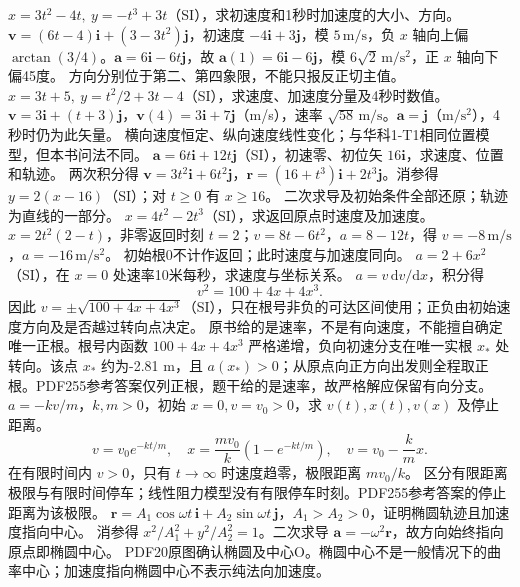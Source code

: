 \problemtext $x=3t^2-4t,\ y=-t^3+3t$（SI），求初速度和1秒时加速度的大小、方向。
\workings $\bm v=(6t-4)\bm i+(3-3t^2)\bm j$，初速度 $-4\bm i+3\bm j$，模 $5\,\mathrm{m/s}$，负 $x$ 轴向上偏 $\arctan(3/4)$。$\bm a=6\bm i-6t\bm j$，故 $\bm a(1)=6\bm i-6\bm j$，模 $6\sqrt2\,\mathrm{m/s^2}$，正 $x$ 轴向下偏45度。
\crosscheck 方向分别位于第二、第四象限，不能只报反正切主值。
\problemtext $x=3t+5,\ y=t^2/2+3t-4$（SI），求速度、加速度分量及4秒时数值。
\workings $\bm v=3\bm i+(t+3)\bm j$，$\bm v(4)=3\bm i+7\bm j$（m/s），速率 $\sqrt{58}\,\mathrm{m/s}$。$\bm a=\bm j$（$\mathrm{m/s^2}$），4秒时仍为此矢量。
\crosscheck 横向速度恒定、纵向速度线性变化；与华科1-T1相同位置模型，但本书问法不同。
\problemtext $\bm a=6t\bm i+12t\bm j$（SI），初速零、初位矢 $16\bm i$，求速度、位置和轨迹。
\workings 两次积分得 $\bm v=3t^2\bm i+6t^2\bm j$，$\bm r=(16+t^3)\bm i+2t^3\bm j$。消参得 $y=2(x-16)$（SI）；对 $t\ge0$ 有 $x\ge16$。
\crosscheck 二次求导及初始条件全部还原；轨迹为直线的一部分。
\problemtext $x=4t^2-2t^3$（SI），求返回原点时速度及加速度。
\workings $x=2t^2(2-t)$，非零返回时刻 $t=2$；$v=8t-6t^2$，$a=8-12t$，得 $v=-8\,\mathrm{m/s}$，$a=-16\,\mathrm{m/s^2}$。
\crosscheck 初始根0不计作返回；此时速度与加速度同向。
\problemtext $a=2+6x^2$（SI），在 $x=0$ 处速率10米每秒，求速度与坐标关系。
\workings $a=v\,\mathrm dv/\mathrm dx$，积分得
\[
v^2=100+4x+4x^3.
\]
因此 $v=\pm\sqrt{100+4x+4x^3}$（SI），只在根号非负的可达区间使用；正负由初始速度方向及是否越过转向点决定。
\crosscheck 原书给的是速率，不是有向速度，不能擅自确定唯一正根。根号内函数 $100+4x+4x^3$ 严格递增，负向初速分支在唯一实根 $x_*$ 处转向。该点 $x_*$ 约为-2.81 m，且 $a(x_*)>0$；从原点向正方向出发则全程取正根。PDF255参考答案仅列正根，题干给的是速率，故严格解应保留有向分支。
\problemtext $a=-kv/m$，$k,m>0$，初始 $x=0,v=v_0>0$，求 $v(t),x(t),v(x)$ 及停止距离。
\workings
\[
v=v_0e^{-kt/m},\quad x=\frac{mv_0}{k}(1-e^{-kt/m}),\quad v=v_0-\frac{k}{m}x.
\]
在有限时间内 $v>0$，只有 $t\to\infty$ 时速度趋零，极限距离 $mv_0/k$。
\crosscheck 区分有限距离极限与有限时间停车；线性阻力模型没有有限停车时刻。PDF255参考答案的停止距离为该极限。
\problemtext $\bm r=A_1\cos\omega t\,\bm i+A_2\sin\omega t\,\bm j$，$A_1>A_2>0$，证明椭圆轨迹且加速度指向中心。
\workings 消参得 $x^2/A_1^2+y^2/A_2^2=1$。二次求导 $\bm a=-\omega^2\bm r$，故方向始终指向原点即椭圆中心。
\crosscheck PDF20原图确认椭圆及中心O。椭圆中心不是一般情况下的曲率中心；加速度指向椭圆中心不表示纯法向加速度。

